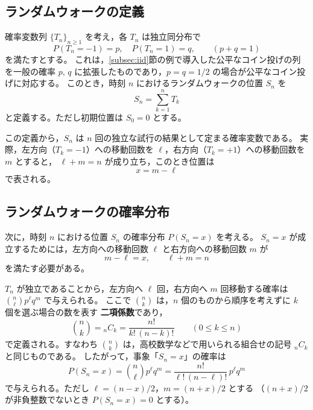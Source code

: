 \documentclass[a4j,dvipdfmx]{jsarticle}
\theoremstyle{plainnote}
\begin{document}
\subsection{ランダムウォークの定義}

確率変数列 $\{T_n\}_{n \geq 1}$ を考え，各 $T_n$ は独立同分布で
\begin{equation}
  P(T_n = -1) = p, \quad P(T_n = 1) = q, \qquad (p + q = 1) \label{eq:rv}
\end{equation}
を満たすとする。
これは，\ref{subsec:iid}節の例で導入した公平なコイン投げの列を一般の確率 $p,\,q$ に拡張したものであり，$p = q = 1/2$ の場合が公平なコイン投げに対応する。
このとき，時刻 $n$ におけるランダムウォークの位置 $S_n$ を
\begin{equation}
  S_n = \sum_{k=1}^{n} T_k \label{eq:Sn}
\end{equation}
と定義する。ただし初期位置は $S_0 = 0$ とする。

この定義から，$S_n$ は $n$ 回の独立な試行の結果として定まる確率変数である。
実際，左方向（$T_k = -1$）への移動回数を $\ell$，右方向（$T_k = +1$）への移動回数を $m$ とすると，
$\ell + m = n$ が成り立ち，このとき位置は
\begin{equation}
  x = m - \ell \label{eq:pos}
\end{equation}
で表される。

\subsection{ランダムウォークの確率分布}

次に，時刻 $n$ における位置 $S_n$ の確率分布 $P(S_n = x)$ を考える。
$S_n = x$ が成立するためには，左方向への移動回数 $\ell$ と右方向への移動回数 $m$ が
\begin{equation}
  m - \ell = x, \qquad \ell + m = n \label{eq:lm}
\end{equation}
を満たす必要がある。

$T_n$ が独立であることから，左方向へ $\ell$ 回，右方向へ $m$ 回移動する確率は
$\binom{n}{\ell} p^\ell q^m$ で与えられる。
ここで $\binom{n}{k}$ は，$n$ 個のものから順序を考えずに $k$ 個を選ぶ場合の数を表す
\textbf{二項係数}であり，
\begin{equation}
  \binom{n}{k} = {}_n C_k = \frac{n!}{k!\,(n-k)!}
  \qquad (0\leq k\leq n)
  \label{eq:binom}
\end{equation}
で定義される。すなわち $\binom{n}{k}$ は，高校数学などで用いられる組合せの記号 ${}_n C_k$ と同じものである。
したがって，事象「$S_n = x$」の確率は
\begin{equation}
  P(S_n = x) = \binom{n}{\ell} p^\ell q^m
  = \frac{n!}{\ell!\,(n-\ell)!}\,p^\ell q^m
  \label{eq:dist}
\end{equation}
で与えられる。ただし $\ell = (n-x)/2$，$m = (n+x)/2$ とする
（$(n+x)/2$ が非負整数でないとき $P(S_n=x)=0$ とする）。
\end{document}
